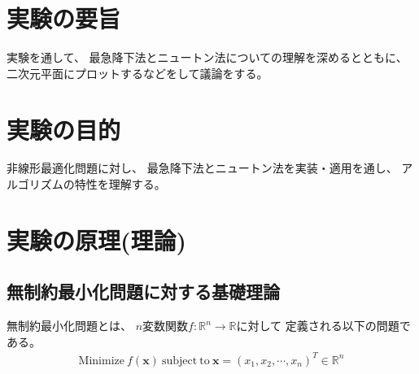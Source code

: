 \documentclass[12pt]{jarticle}
\begin{document}



\section{実験の要旨}
実験を通して、
最急降下法とニュートン法についての理解を深めるとともに、
二次元平面にプロットするなどをして議論をする。

\section{実験の目的}
非線形最適化問題に対し、
最急降下法とニュートン法を実装・適用を通し、
アルゴリズムの特性を理解する。

\section{実験の原理(理論)}
\subsection{無制約最小化問題に対する基礎理論}
無制約最小化問題とは、
$n$変数関数$f:\mathbb{R}^n \rightarrow \mathbb{R}$に対して
定義される以下の問題である。
\begin{eqnarray}
    \text{Minimize}\ f(\boldsymbol{x})\ \text{subject}\ \text{to}\ \boldsymbol{x}=(x_1,x_2,\cdots,x_n)^T \in \mathbb{R}^n\nonumber
\end{eqnarray}
\end{document}
